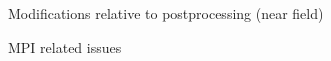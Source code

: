 \documentclass[smaller,xcolor=table,dvipsnames]{beamer}
\newcommand{\dirinputtex}{./inputtex}
\begin{document}

  \begin{frame}[plain]
    \centering \Large{Modifications relative to postprocessing (near
      field)}
    
  \end{frame}
  
  
  

  \begin{frame}[plain,label=MPI]
    \centering    \Large{MPI related issues}
  \end{frame}


  






  
\end{document}
